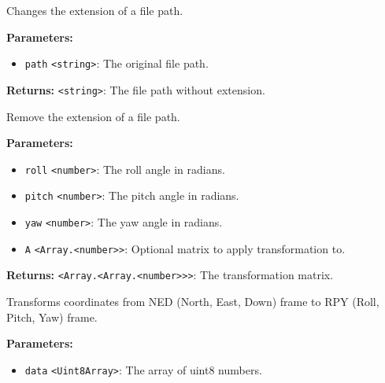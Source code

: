 \documentclass[12pt,a4paper]{article}
\begin{document}
\noindent Changes the extension of a file path.

\vspace{5mm}
\noindent {}


\noindent \textbf{Parameters:}
\begin{itemize}
  \item \texttt{path} \texttt{<string>}: The original file path.
\end{itemize}

\noindent \textbf{Returns:} \texttt{<string>}: The file path without extension.

\noindent Remove the extension of a file path.

\vspace{5mm}
\noindent {}


\noindent \textbf{Parameters:}
\begin{itemize}
  \item \texttt{roll} \texttt{<number>}: The roll angle in radians.
  \item \texttt{pitch} \texttt{<number>}: The pitch angle in radians.
  \item \texttt{yaw} \texttt{<number>}: The yaw angle in radians.
  \item \texttt{A} \texttt{<Array.<number>>}: Optional matrix to apply transformation to.
\end{itemize}

\noindent \textbf{Returns:} \texttt{<Array.<Array.<number>>>}: The transformation matrix.

\noindent Transforms coordinates from NED (North, East, Down) frame to RPY (Roll, Pitch, Yaw) frame.

\vspace{5mm}
\noindent {}


\noindent \textbf{Parameters:}
\begin{itemize}
  \item \texttt{data} \texttt{<Uint8Array>}: The array of uint8 numbers.
\end{itemize}
\end{document}
